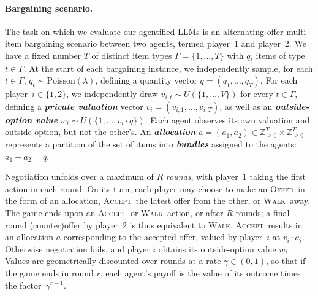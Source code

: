 \documentclass{article}
\theoremstyle{plain}
\theoremstyle{definition}
\theoremstyle{remark}
\newcommand{\term}[1]{\textbf{\textit{#1}}}
\newcommand{\OFFER}{\textsc{Offer}}
\newcommand{\ACCEPT}{\textsc{Accept}}
\newcommand{\WALK}{\textsc{Walk}}
\newcommand{\itemtypes}{\Gamma}
\begin{document}
\paragraph{Bargaining scenario.} 
The task on which we evaluate our agentified LLMs is an alternating-offer multi-item bargaining scenario between two agents, termed player~1 and player~2.
We have a fixed number $T$ of distinct item types $\itemtypes=\{1,\dots,T\}$ with $q_t$ items of type $t \in \itemtypes$. 
At the start of each bargaining instance, we independently sample, for each $t \in \itemtypes$, $q_t \sim \text{Poisson}(\lambda)$, defining a quantity vector $q = (q_1,\dots,q_T)$. %
For each player~$i\in\{1,2\}$, we independently draw $v_{i,t}\sim U(\{1,\dots,V\})$ for every $t\in\itemtypes$, defining a \term{private valuation} vector $v_i = (v_{i,1},\dots,v_{i,T})$, as well as an \term{outside-option value} $w_i \sim U(\{1,\dots,v_i\cdot q\})$.
Each agent observes its own valuation and outside option, but not the other's. 
An \term{allocation} $a=(a_1,a_2)\in \mathbb{Z}_{\ge0}^{T}\times \mathbb{Z}_{\ge0}^{T}$ represents a partition of the set of items into \term{bundles} assigned to the agents: $a_1+a_2=q$. 

Negotiation unfolds over a maximum of $R$ \textit{rounds}, with player~1 taking the first action in each round. 
On its turn, each player may choose to make an \OFFER\ in the form of an allocation, \ACCEPT\ the latest offer from the other, or \WALK\ away. 
The game ends upon an \ACCEPT\ or \WALK\ action, or after $R$ rounds; a final-round (counter)offer by player~2 is thus equivalent to \WALK. 
\ACCEPT\ results in an allocation $a$ corresponding to the accepted offer, valued by player~$i$ at $v_i \cdot a_i$.
Otherwise negotiation fails, and player $i$ obtains its outside-option value $w_i$. 
Values are geometrically discounted over rounds at a rate $\gamma \in (0,1)$, so that if the game ends in round $r$, each agent's payoff is the value of its outcome times the factor~$\gamma^{r-1}$.

\end{document}
